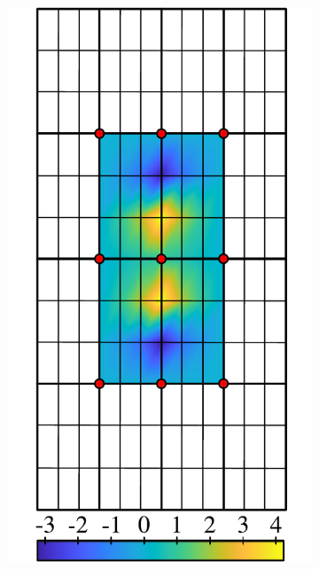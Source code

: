 \begin{figure} [htbp]
\begin{subfigure}[t]{0.22\textwidth}
  \centerline{\includegraphics[width=\linewidth]{figs/MsRSB/FE_12x12_c}}
  \caption{\label{fig:fem_demo_orig}}
\end{subfigure}
\hfill
\begin{subfigure}[t]{0.22\textwidth}

\end{subfigure}
\end{figure}
